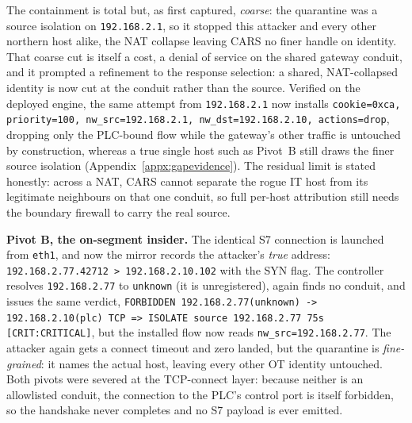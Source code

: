 The containment is total but, as first captured, \emph{coarse}: the quarantine was a source isolation on \texttt{192.168.2.1}, so it stopped this attacker and every other northern host alike, the NAT collapse leaving CARS no finer handle on identity. That coarse cut is itself a cost, a denial of service on the shared gateway conduit, and it prompted a refinement to the response selection: a shared, NAT-collapsed identity is now cut at the conduit rather than the source. Verified on the deployed engine, the same attempt from \texttt{192.168.2.1} now installs \texttt{cookie=0xca, priority=100, nw\_src=192.168.2.1, nw\_dst=192.168.2.10, actions=drop}, dropping only the PLC-bound flow while the gateway's other traffic is untouched by construction, whereas a true single host such as Pivot~B still draws the finer source isolation (Appendix~\ref{appx:gapevidence}). The residual limit is stated honestly: across a NAT, CARS cannot separate the rogue IT host from its legitimate neighbours on that one conduit, so full per-host attribution still needs the boundary firewall to carry the real source.

\textbf{Pivot B, the on-segment insider.} The identical S7 connection is launched from \texttt{eth1}, and now the mirror records the attacker's \emph{true} address: \texttt{192.168.2.77.42712 > 192.168.2.10.102} with the SYN flag. The controller resolves \texttt{192.168.2.77} to \texttt{unknown} (it is unregistered), again finds no conduit, and issues the same verdict, \texttt{FORBIDDEN 192.168.2.77(unknown) -> 192.168.2.10(plc) TCP => ISOLATE source 192.168.2.77 75s [CRIT:CRITICAL]}, but the installed flow now reads \texttt{nw\_src=192.168.2.77}. The attacker again gets a connect timeout and zero landed, but the quarantine is \emph{fine-grained}: it names the actual host, leaving every other OT identity untouched. Both pivots were severed at the TCP-connect layer: because neither is an allowlisted conduit, the connection to the PLC's control port is itself forbidden, so the handshake never completes and no S7 payload is ever emitted.

